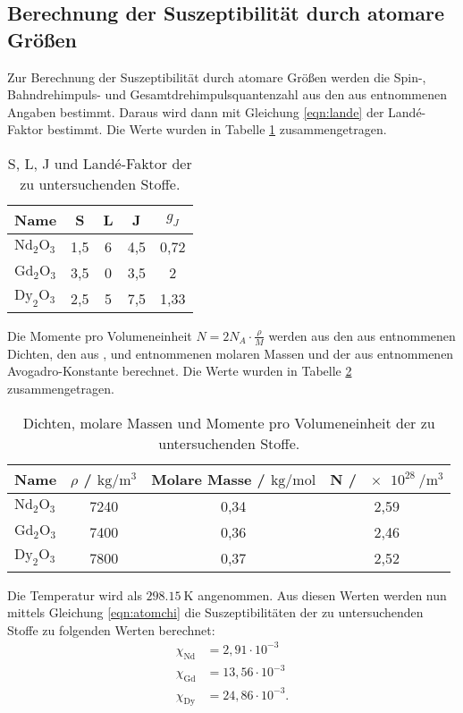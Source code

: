 \subsection{Berechnung der Suszeptibilität durch atomare Größen}
Zur Berechnung der Suszeptibilität durch atomare Größen werden die Spin-, Bahndrehimpuls- und Gesamtdrehimpulsquantenzahl aus den aus \cite{sample} entnommenen Angaben bestimmt.
Daraus wird dann mit Gleichung \eqref{eqn:lande} der Landé-Faktor bestimmt. Die Werte wurden in Tabelle \ref{tab:lande} zusammengetragen.
\begin{table}
  \centering
  \caption{S, L, J und Landé-Faktor der zu untersuchenden Stoffe.}
  \label{tab:lande}
  \begin{tabular}{l c c c c}
    \toprule
Name & S & L & J & $g_J$ \\
    \midrule
  $\text{Nd}_2 \text{O}_3$ & 1,5 & 6 & 4,5 & 0,72 \\
  $\text{Gd}_2 \text{O}_3$ & 3,5 & 0 & 3,5 & 2 \\
  $\text{Dy}_2 \text{O}_3$ & 2,5 & 5 & 7,5 & 1,33 \\
  \bottomrule
  \end{tabular}
\end{table}
Die Momente pro Volumeneinheit $N=2 N_A \cdot \frac{\rho}{M}$ werden aus den aus \cite{sample} entnommenen Dichten, den aus \cite{dy}, \cite{gd} und \cite{nd} entnommenen molaren Massen und der
aus \cite{scipy} entnommenen Avogadro-Konstante berechnet. Die Werte wurden in Tabelle \ref{tab:N} zusammengetragen.
\begin{table}
  \centering
  \caption{Dichten, molare Massen und Momente pro Volumeneinheit der zu untersuchenden Stoffe.}
  \label{tab:N}
  \begin{tabular}{l c c c}
    \toprule
Name & $\rho$ / $\si{\kilo\gram\per\meter\cubed}$ & Molare Masse / $\si{\kilo\gram\per\mol}$ & N / $\SI{e28}{\per\meter\cubed}$ \\
    \midrule
  $\text{Nd}_2 \text{O}_3$ & 7240 & 0,34 & 2,59\\
  $\text{Gd}_2 \text{O}_3$ & 7400 & 0,36 & 2,46\\
  $\text{Dy}_2 \text{O}_3$ & 7800 & 0,37 & 2,52 \\
  \bottomrule
  \end{tabular}
\end{table}
Die Temperatur wird als $\SI{298.15}{\kelvin}$ angenommen.
Aus diesen Werten werden nun mittels Gleichung \eqref{eqn:atomchi} die Suszeptibilitäten der zu untersuchenden Stoffe zu folgenden Werten berechnet:
\begin{align*}
  \chi_\text{Nd} &= 2,91\cdot10^{-3} \\
  \chi_\text{Gd} &= 13,56\cdot10^{-3}\\
  \chi_\text{Dy} &= 24,86\cdot10^{-3} .
\end{align*}
